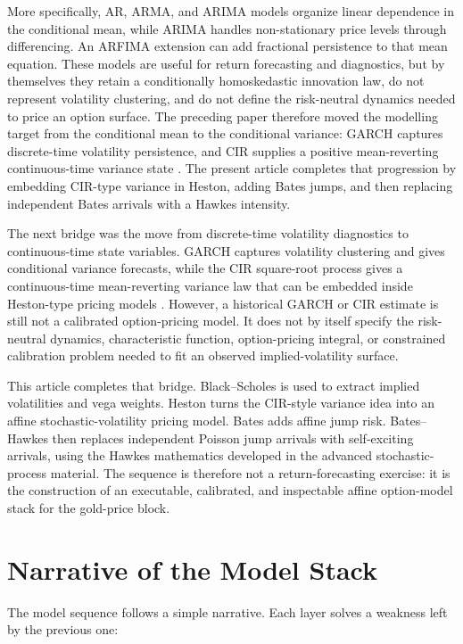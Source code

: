 \documentclass[a4paper,10pt,titlepage,oneside,openany]{book}
\theoremstyle{plain}
\theoremstyle{definition}
\theoremstyle{remark}
\begin{document}
More specifically, AR, ARMA, and ARIMA models organize linear dependence in the conditional mean, while ARIMA handles non-stationary price levels through differencing. An ARFIMA extension can add fractional persistence to that mean equation. These models are useful for return forecasting and diagnostics, but by themselves they retain a conditionally homoskedastic innovation law, do not represent volatility clustering, and do not define the risk-neutral dynamics needed to price an option surface. The preceding paper therefore moved the modelling target from the conditional mean to the conditional variance: GARCH captures discrete-time volatility persistence, and CIR supplies a positive mean-reverting continuous-time variance state \cite{BarrickArticle6}. The present article completes that progression by embedding CIR-type variance in Heston, adding Bates jumps, and then replacing independent Bates arrivals with a Hawkes intensity.

The next bridge was the move from discrete-time volatility diagnostics to continuous-time state variables. GARCH captures volatility clustering and gives conditional variance forecasts, while the CIR square-root process gives a continuous-time mean-reverting variance law that can be embedded inside Heston-type pricing models \cite{BarrickArticle6,BarrickArticle7}. However, a historical GARCH or CIR estimate is still not a calibrated option-pricing model. It does not by itself specify the risk-neutral dynamics, characteristic function, option-pricing integral, or constrained calibration problem needed to fit an observed implied-volatility surface.

This article completes that bridge. Black--Scholes is used to extract implied volatilities and vega weights. Heston turns the CIR-style variance idea into an affine stochastic-volatility pricing model. Bates adds affine jump risk. Bates--Hawkes then replaces independent Poisson jump arrivals with self-exciting arrivals, using the Hawkes mathematics developed in the advanced stochastic-process material. The sequence is therefore not a return-forecasting exercise: it is the construction of an executable, calibrated, and inspectable affine option-model stack for the gold-price block.

\section{Narrative of the Model Stack}

The model sequence follows a simple narrative. Each layer solves a weakness left by the previous one:
\end{document}
